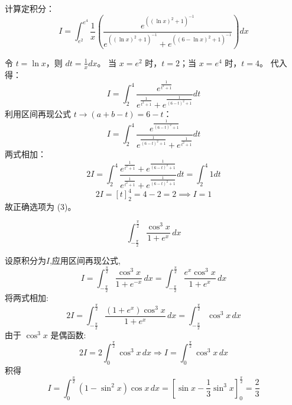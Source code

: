 \begin{questions}
    \question
计算定积分：
\[ I = \int_{e^2}^{e^4} \frac{1}{x} \left( \frac{e^{((\ln x)^2+1)^{-1}}}{e^{((\ln x)^2+1)^{-1}} + e^{((6-\ln x)^2+1)^{-1}}} \right) dx \]

\begin{solution}
令 $t = \ln x$，则 $dt = \frac{1}{x} dx$。
当 $x = e^2$ 时，$t = 2$；当 $x = e^4$ 时，$t = 4$。
代入得：
\[ I = \int_{2}^{4} \frac{e^{\frac{1}{t^2+1}}}{e^{\frac{1}{t^2+1}} + e^{\frac{1}{(6-t)^2+1}}} dt \]
利用区间再现公式 $t \to (a+b-t) = 6-t$：
\[ I = \int_{2}^{4} \frac{e^{\frac{1}{(6-t)^2+1}}}{e^{\frac{1}{(6-t)^2+1}} + e^{\frac{1}{t^2+1}}} dt \]
两式相加：
\[ 2I = \int_{2}^{4} \frac{e^{\frac{1}{t^2+1}} + e^{\frac{1}{(6-t)^2+1}}}{e^{\frac{1}{t^2+1}} + e^{\frac{1}{(6-t)^2+1}}} dt = \int_{2}^{4} 1 dt \]
\[ 2I = [t]_2^4 = 4 - 2 = 2 \implies I = 1 \]
故正确选项为 (3)。
\end{solution}

    \question 
    \[
    \int_{-\frac{\pi}{2}}^{\frac{\pi}{2}} \frac{\cos^3 x}{1 + e^x} \, dx
    \]
    \begin{solution}
        设原积分为$I$,应用区间再现公式,
        \[
        I = \int_{-\frac{\pi}{2}}^{\frac{\pi}{2}} \frac{\cos^3 x}{1 + e^{-x}} \, dx = \int_{-\frac{\pi}{2}}^{\frac{\pi}{2}} \frac{e^x \cos^3 x}{1 + e^x} \, dx
        \]
        将两式相加:
        \[
        2I = \int_{-\frac{\pi}{2}}^{\frac{\pi}{2}} \frac{(1 + e^x) \cos^3 x}{1 + e^x} \, dx = \int_{-\frac{\pi}{2}}^{\frac{\pi}{2}} \cos^3 x \, dx
        \]
        由于 $\cos^3 x$ 是偶函数:
        \[
        2I = 2 \int_{0}^{\frac{\pi}{2}} \cos^3 x \, dx \Rightarrow I = \int_{0}^{\frac{\pi}{2}} \cos^3 x \, dx
        \]
        积得
        \[
        I = \int_{0}^{\frac{\pi}{2}} (1 - \sin^2 x) \cos x \, dx = \left[ \sin x - \frac{1}{3}\sin^3 x \right]_{0}^{\frac{\pi}{2}} = \frac{2}{3}
        \]
    \end{solution}


\end{questions}
